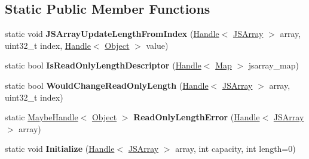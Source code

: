 \subsection*{Static Public Member Functions}
\begin{DoxyCompactItemize}
\item 
\hypertarget{classv8_1_1internal_1_1_j_s_array_a11826b5c857d92c2fb17910c125c4b6a}{}static void {\bfseries J\+S\+Array\+Update\+Length\+From\+Index} (\hyperlink{classv8_1_1internal_1_1_handle}{Handle}$<$ \hyperlink{classv8_1_1internal_1_1_j_s_array}{J\+S\+Array} $>$ array, uint32\+\_\+t index, \hyperlink{classv8_1_1internal_1_1_handle}{Handle}$<$ \hyperlink{classv8_1_1internal_1_1_object}{Object} $>$ value)\label{classv8_1_1internal_1_1_j_s_array_a11826b5c857d92c2fb17910c125c4b6a}

\item 
\hypertarget{classv8_1_1internal_1_1_j_s_array_a34e28ca08ae510acb361146ff8de0115}{}static bool {\bfseries Is\+Read\+Only\+Length\+Descriptor} (\hyperlink{classv8_1_1internal_1_1_handle}{Handle}$<$ \hyperlink{classv8_1_1internal_1_1_map}{Map} $>$ jsarray\+\_\+map)\label{classv8_1_1internal_1_1_j_s_array_a34e28ca08ae510acb361146ff8de0115}

\item 
\hypertarget{classv8_1_1internal_1_1_j_s_array_ab250b04720a407005395098e350026f5}{}static bool {\bfseries Would\+Change\+Read\+Only\+Length} (\hyperlink{classv8_1_1internal_1_1_handle}{Handle}$<$ \hyperlink{classv8_1_1internal_1_1_j_s_array}{J\+S\+Array} $>$ array, uint32\+\_\+t index)\label{classv8_1_1internal_1_1_j_s_array_ab250b04720a407005395098e350026f5}

\item 
\hypertarget{classv8_1_1internal_1_1_j_s_array_a8ebaf5c8a75a98dccd0671d9ab5e2185}{}static \hyperlink{classv8_1_1internal_1_1_maybe_handle}{Maybe\+Handle}$<$ \hyperlink{classv8_1_1internal_1_1_object}{Object} $>$ {\bfseries Read\+Only\+Length\+Error} (\hyperlink{classv8_1_1internal_1_1_handle}{Handle}$<$ \hyperlink{classv8_1_1internal_1_1_j_s_array}{J\+S\+Array} $>$ array)\label{classv8_1_1internal_1_1_j_s_array_a8ebaf5c8a75a98dccd0671d9ab5e2185}

\item 
\hypertarget{classv8_1_1internal_1_1_j_s_array_ac34bb2e7768e194e679b3b1556b4e168}{}static void {\bfseries Initialize} (\hyperlink{classv8_1_1internal_1_1_handle}{Handle}$<$ \hyperlink{classv8_1_1internal_1_1_j_s_array}{J\+S\+Array} $>$ array, int capacity, int length=0)\label{classv8_1_1internal_1_1_j_s_array_ac34bb2e7768e194e679b3b1556b4e168}


\end{DoxyCompactItemize}
